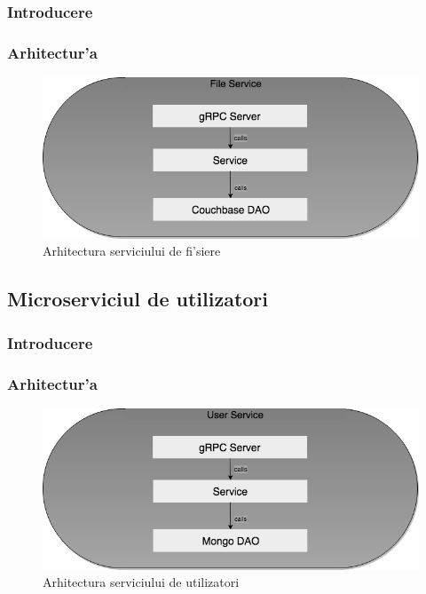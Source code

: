 \documentclass[12pt,a4paper,twoside]{report}
\begin{document}
\subsubsection{Introducere}
\subsubsection{Arhitectur'a}

\begin{figure}[H]
\begin{center}
\advance\leftskip-3cm
\advance\rightskip-3cm
\includegraphics[keepaspectratio=true,scale=0.4]{img/file_arch.png}
\caption{Arhitectura serviciului de fi'siere}
\label{file_arch}
\end{center}
\end{figure}


\subsection{Microserviciul de utilizatori}  \label{s_user}
\subsubsection{Introducere}
\subsubsection{Arhitectur'a}

\begin{figure}[H]
\begin{center}
\advance\leftskip-3cm
\advance\rightskip-3cm
\includegraphics[keepaspectratio=true,scale=0.4]{img/user_arch.png}
\caption{Arhitectura serviciului de utilizatori}
\label{user_arch}
\end{center}
\end{figure}
\end{document}
